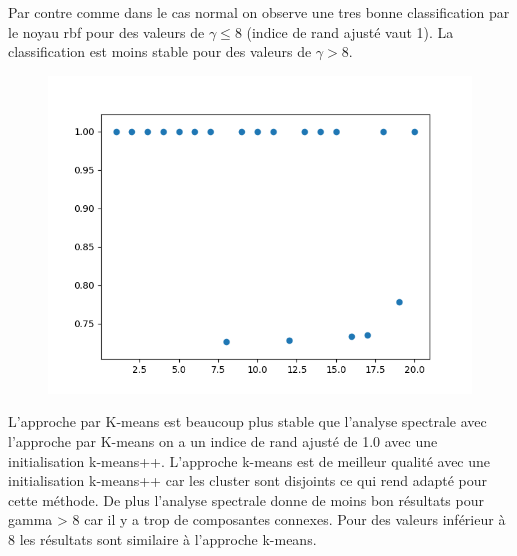 \documentclass[12pt]{scrartcl} %
\begin{document}
\newline 
Par contre comme dans le cas normal on observe une tres bonne classification par le noyau rbf pour des valeurs de $\gamma\leq 8$ (indice de rand ajusté vaut 1). La classification est moins stable pour des valeurs de $\gamma >8$. 
\newline
\begin{figure}[!h]
 \centering 
\includegraphics[scale=.5]{spectralUnifRBF.png}
\end{figure}
\newline 
L'approche par K-means est beaucoup plus stable que l'analyse spectrale avec l'approche par K-means on a un indice de rand ajusté de 1.0 avec une initialisation k-means++. L'approche k-means est de meilleur qualité avec une initialisation k-means++ car les cluster sont disjoints ce qui rend adapté pour cette méthode. De plus l'analyse spectrale donne de moins bon résultats pour gamma > 8 car il y a trop de composantes connexes. Pour des valeurs inférieur à 8 les résultats sont similaire à l'approche k-means.
\end{document}

